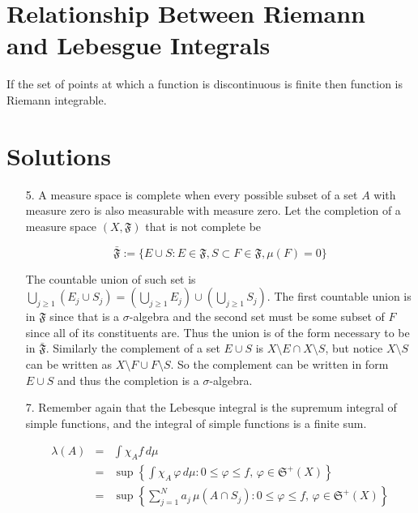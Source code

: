 \documentclass[oneside]{book}
\begin{document}
\section{Relationship Between Riemann and Lebesgue Integrals}
If the set of points at which a function is discontinuous is finite then function is Riemann integrable. 

\section*{Solutions}
\begin{enumerate}

\item[5.] A measure space is complete when every possible subset of a set $A$ with measure zero is also measurable with measure zero. Let the completion of a measure space $(X,\mathfrak{F})$ that is not complete be

\begin{equation}
\bar{\mathfrak{F}} := \{ E \cup S: E \in \mathfrak{F}, S \subset F \in \mathfrak{F}, \mu(F) =0 \}
\end{equation}

The countable union of such set is $\bigcup_{j \ge 1} (E_j \cup S_j) = \left( \bigcup_{j \ge 1} E_j \right) \cup \left( \bigcup_{j \ge 1} S_j \right)$. The first countable union is in $\mathfrak{F}$ since that is a $\sigma$-algebra and the second set must be some subset of $F$ since all of its constituents are. Thus the union is of the form necessary to be in $\bar{\mathfrak{F}}$. Similarly the complement of a set $E \cup S$ is $X \setminus E \cap X \setminus S$, but notice $X \setminus S$ can be written as $X \setminus F \cup F \setminus S$. So the complement can be written in form $E \cup S$ and thus the completion is a $\sigma$-algebra. 

\item[7.] Remember again that the Lebesque integral is the supremum integral of simple functions, and the integral of simple functions is a finite sum. 

\begin{eqnarray}
\lambda(A) &=& \int \chi_A f\, d\mu \nonumber \\
&=& \sup \left\{ \int \chi_A\, \varphi\, d\mu: 0 \le \varphi \le f,\, \varphi \in \mathfrak{S}^+(X) \right\}  \nonumber \\
&=& \sup \left\{\sum_{j=1}^N a_j\, \mu(A \cap S_j): 0 \le \varphi \le f,\, \varphi \in \mathfrak{S}^+(X) \right\}  \nonumber \\
\end{eqnarray}


\end{enumerate}
\end{document}
